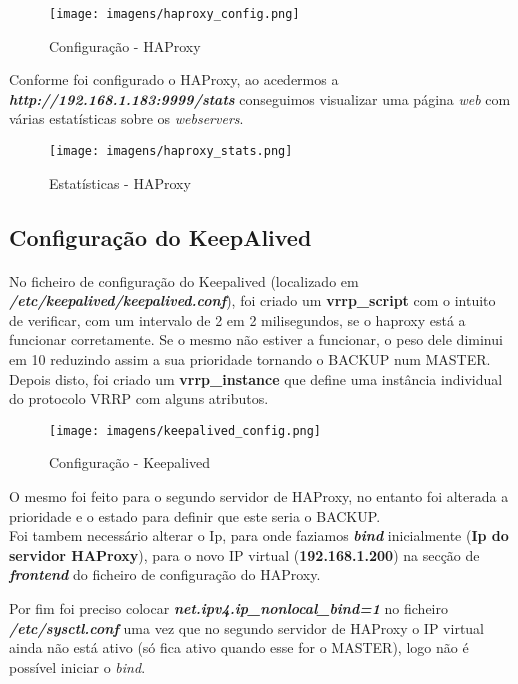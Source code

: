 \documentclass{report}
\begin{document}
\begin{figure}[H]
\center
\texttt{[image: imagens/haproxy\_config.png]}
\caption{Configuração - HAProxy}
\label{fig.nav}
\end{figure}

Conforme foi configurado o HAProxy, ao acedermos a \textbf{\emph{http://192.168.1.183:9999/stats}} conseguimos visualizar uma página \emph{web} com várias estatísticas sobre os \emph{webservers}. 

\begin{figure}[H]
\center
\texttt{[image: imagens/haproxy\_stats.png]}
\caption{Estatísticas - HAProxy}
\label{fig.nav}
\end{figure}


\subsection{Configuração do KeepAlived}
\paragraph{}
No ficheiro de configuração do Keepalived (localizado em \textbf{\emph{/etc/keepalived/keepalived.conf}}), foi criado um \textbf{vrrp\_script} com o intuito de verificar, com um intervalo de 2 em 2 milisegundos, se o haproxy está a funcionar corretamente. Se o mesmo não estiver a funcionar, o peso dele diminui em 10 reduzindo assim a sua prioridade tornando o BACKUP num MASTER.\\
Depois disto, foi criado um \textbf{vrrp\_instance} que define uma instância individual do protocolo VRRP com alguns atributos.

\begin{figure}[H]
\center
\texttt{[image: imagens/keepalived\_config.png]}
\caption{Configuração - Keepalived}
\label{fig.nav}
\end{figure}

O mesmo foi feito para o segundo servidor de HAProxy, no entanto foi alterada a prioridade e o estado para definir que este seria o BACKUP.\\

Foi tambem necessário alterar o Ip, para onde faziamos \textbf{\emph{bind}} inicialmente (\textbf{Ip do servidor HAProxy}),  para o novo IP virtual (\textbf{192.168.1.200}) na secção de \textbf{\emph{frontend}} do ficheiro de configuração do HAProxy.

Por fim foi preciso colocar \textbf{\emph{net.ipv4.ip\_nonlocal\_bind=1}} no ficheiro \textbf{\emph{/etc/sysctl.conf}} uma vez que no segundo servidor de HAProxy o IP virtual ainda não está ativo (só fica ativo quando esse for o MASTER), logo não é possível iniciar o \emph{bind}.
\end{document}
